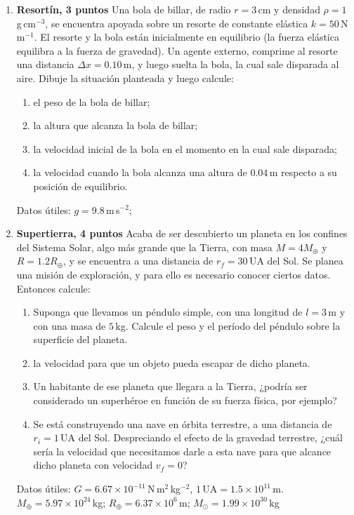 \documentclass[a4paper,12pt]{article}
\begin{document}
\begin{enumerate}
	\item{\bf{Resortín, 3 puntos}}
		Una bola de billar, de radio $r=3$\,cm y densidad
		$\rho=1$\,g\,cm$^{-3}$, se encuentra apoyada sobre un resorte de
		constante elástica $k=50$\,N\,m$^{-1}$. El resorte y la bola están
		inicialmente en equilibrio (la fuerza elástica equilibra a la fuerza de
		gravedad). Un agente externo, comprime al resorte una distancia $\Delta
		x=0.10$\,m, y luego suelta la bola, la cual sale disparada al aire.
		Dibuje la situación planteada y luego calcule:
		\begin{enumerate}
			\item el peso de la bola de billar;
			\item la altura que alcanza la bola de billar;
			\item la velocidad inicial de la bola en el momento en la cual sale
				disparada;
			\item la velocidad cuando la bola alcanza una altura de $0.04$\,m
				respecto a su posición de equilibrio.
		\end{enumerate}
		Datos útiles: $g = 9.8$\,m\,s$^{-2}$;

	\item{\bf{Supertierra, 4 puntos}}
		Acaba de ser descubierto un planeta en los confines del Sistema Solar,
		algo más grande que la Tierra, con masa $M=4 M_\oplus$ y $R=1.2
		R_\oplus$, y se encuentra a una distancia de $r_f=30$\,UA del Sol. Se
		planea una misión de exploración, y para ello es necesario conocer
		ciertos datos. Entonces calcule:
		\begin{enumerate}
			\item Suponga que llevamos un péndulo simple, con una longitud
				de $l=3$\,m y con una masa de $5$\,kg. Calcule el peso y el
				período del péndulo sobre la superficie del planeta.
			\item la velocidad para que un objeto pueda escapar de dicho
				planeta.
			\item Un habitante de ese planeta que llegara a la Tierra, ¿podría
				ser considerado un superhéroe en función de su fuerza física,
				por ejemplo?
			\item Se está construyendo una nave en órbita terrestre, a una
				distancia de $r_i=1$\,UA del Sol. Despreciando el efecto de la
				gravedad terrestre, ¿cuál sería la velocidad que necesitamos
				darle a esta nave para que alcance dicho planeta con velocidad
				$v_f=0$?
		\end{enumerate}
		Datos útiles: $G = 6.67 \times 10^{-11}$\,N\,m$^2$\,kg$^{-2}$, $1$\,UA$
		= 1.5\times 10^{11}$\,m.  $M_\oplus=5.97\times 10^{24}$\,kg;
		$R_\oplus=6.37\times 10^{6}$\,m; $M_\odot=1.99\times 10^{30}$\,kg
	

\end{enumerate}
\end{document}
